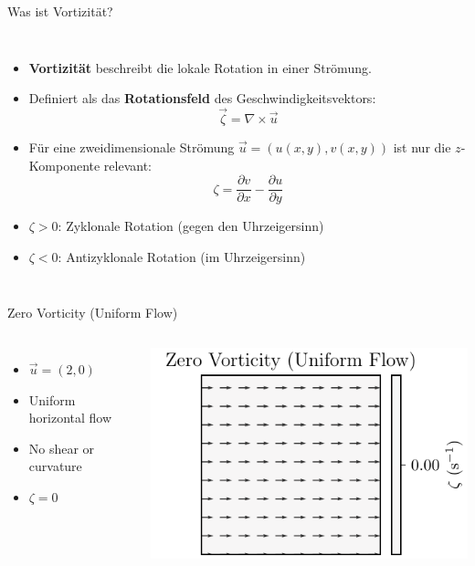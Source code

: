 
\begin{frame}{Was ist Vortizität?}
	\begin{columns}
		\begin{itemize}
			\item \textbf{Vortizität} beschreibt die lokale Rotation in einer Strömung.
			\item Definiert als das \textbf{Rotationsfeld} des Geschwindigkeitsvektors:
			      \[
				      \vec{\zeta} = \nabla \times \vec{u}
			      \]
			\item Für eine zweidimensionale Strömung \( \vec{u} = (u(x,y), v(x,y)) \) ist nur die \(z\)-Komponente relevant:
			      \[
				      \zeta = \frac{\partial v}{\partial x} - \frac{\partial u}{\partial y}
			      \]
			\item \(\zeta > 0\): Zyklonale Rotation (gegen den Uhrzeigersinn)
			\item \(\zeta < 0\): Antizyklonale Rotation (im Uhrzeigersinn)
		\end{itemize}

		\vspace{2cm}  %
	\end{columns}
\end{frame}


\begin{frame}{Zero Vorticity (Uniform Flow)}
	\begin{columns}
		\column{0.5\textwidth}
		\begin{itemize}
			\item \( \vec{u} = (2, 0) \)
			\item Uniform horizontal flow
			\item No shear or curvature
			\item \( \zeta = 0 \)
		\end{itemize}

		\column{0.5\textwidth}
		\includegraphics[width=\linewidth]{../images/vorticity_plot0.pdf}
	\end{columns}
\end{frame}

